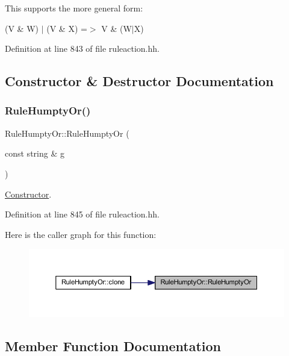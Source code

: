 This supports the more general form\+:
\begin{DoxyItemize}
\item {\ttfamily (V \& W) $\vert$ (V \& X) =$>$ V \& (W$\vert$X)} 
\end{DoxyItemize}

Definition at line 843 of file ruleaction.\+hh.



\subsection{Constructor \& Destructor Documentation}
\mbox{\label{class_rule_humpty_or_ab2a8a1b973bb72d083e16cefa3a47621}} 
\subsubsection{\texorpdfstring{RuleHumptyOr()}{RuleHumptyOr()}}
{\footnotesize\ttfamily Rule\+Humpty\+Or\+::\+Rule\+Humpty\+Or (\begin{DoxyParamCaption}\item[{const string \&}]{g }\end{DoxyParamCaption})\hspace{0.3cm}{\ttfamily [inline]}}



\mbox{\hyperlink{class_constructor}{Constructor}}. 



Definition at line 845 of file ruleaction.\+hh.

Here is the caller graph for this function\+:
\nopagebreak
\begin{figure}[H]
\begin{center}
\leavevmode
\includegraphics[width=350pt]{class_rule_humpty_or_ab2a8a1b973bb72d083e16cefa3a47621_icgraph}
\end{center}
\end{figure}


\subsection{Member Function Documentation}
\mbox{\label{class_rule_humpty_or_a247cf69f4d753d28a0bcaa14d8cf0abe}} 
